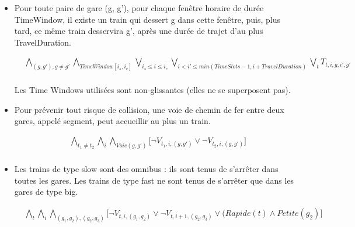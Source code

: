 \documentclass[a4paper]{article}
\begin{document}
\begin{itemize}

\item{Pour toute paire de gare (g, g'), pour chaque fenêtre horaire de durée TimeWindow,
il existe un train qui dessert g dans cette fenêtre, puis, plus tard, ce même train
desservira g', après une durée de trajet d’au plus TravelDuration.}

    \begin{equation*}
    \begin{split}
      & 
      \bigwedge_{(g,g'), g \neq g'} 
      \bigwedge_{TimeWindow [i_s,i_e]}
      \bigvee_{i_s \leq i \leq i_e}
      \bigvee_{i < i' \leq min(TimeSlots - 1, i + TravelDuration)}
      \bigvee_{t}
      T_{t,i,g,i', g'} \\
    \end{split}
    \end{equation*}

Les Time Windows utilisées sont non-glissantes (elles ne se superposent pas).
    
    

\item{Pour prévenir tout risque de collision, une voie de chemin de fer entre deux gares,
appelé segment, peut accueillir au plus un train.}

    \begin{equation*}
    \begin{split}
      & \bigwedge_{t_1 \neq t_2}
      \bigwedge_{i}
      \bigwedge_{Voie (g,g')} \big[
      \neg V_{t_1,i,(g,g')} \lor \neg V_{t_2,i,(g,g')} \big] \\
    \end{split}
    \end{equation*}

\item{Les trains de type slow sont des omnibus : ils sont tenus de s’arrêter dans toutes les
gares. Les trains de type fast ne sont tenus de s’arrêter que dans les gares de type big.}

    \begin{equation*}
    \begin{split}
      & \bigwedge_{t}
      \bigwedge_{i}
      \bigwedge_{(g_1,g_2), (g_2, g_3)}  \big[
      \neg V_{t,i,(g_1,g_2)} \lor \neg V_{t,i+1,(g_2,g_3)} \lor (Rapide(t) \land Petite(g_2) \big] \\
    \end{split}
    \end{equation*}


\end{itemize}
\end{document}
